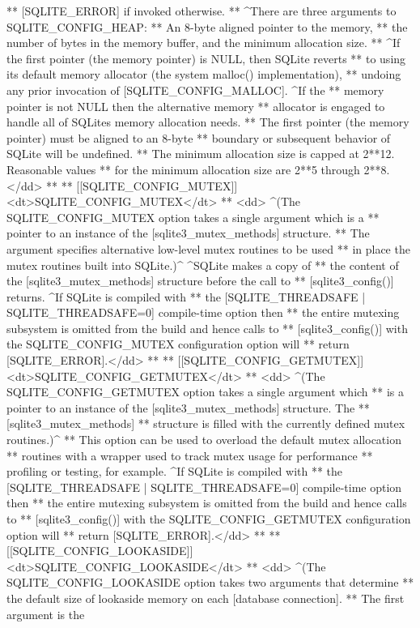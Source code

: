 \begin{Codex}[label=sqlite3.h,numbers=left]
{** [SQLITE_ERROR] if invoked otherwise.
** ^There are three arguments to SQLITE_CONFIG_HEAP:
** An 8-byte aligned pointer to the memory,
** the number of bytes in the memory buffer, and the minimum allocation size.
** ^If the first pointer (the memory pointer) is NULL, then SQLite reverts
** to using its default memory allocator (the system malloc() implementation),
** undoing any prior invocation of [SQLITE_CONFIG_MALLOC].  ^If the
** memory pointer is not NULL then the alternative memory
** allocator is engaged to handle all of SQLites memory allocation needs.
** The first pointer (the memory pointer) must be aligned to an 8-byte
** boundary or subsequent behavior of SQLite will be undefined.
** The minimum allocation size is capped at 2**12. Reasonable values
** for the minimum allocation size are 2**5 through 2**8.</dd>
**
** [[SQLITE_CONFIG_MUTEX]] <dt>SQLITE_CONFIG_MUTEX</dt>
** <dd> ^(The SQLITE_CONFIG_MUTEX option takes a single argument which is a
** pointer to an instance of the [sqlite3_mutex_methods] structure.
** The argument specifies alternative low-level mutex routines to be used
** in place the mutex routines built into SQLite.)^  ^SQLite makes a copy of
** the content of the [sqlite3_mutex_methods] structure before the call to
** [sqlite3_config()] returns. ^If SQLite is compiled with
** the [SQLITE_THREADSAFE | SQLITE_THREADSAFE=0] compile-time option then
** the entire mutexing subsystem is omitted from the build and hence calls to
** [sqlite3_config()] with the SQLITE_CONFIG_MUTEX configuration option will
** return [SQLITE_ERROR].</dd>
**
** [[SQLITE_CONFIG_GETMUTEX]] <dt>SQLITE_CONFIG_GETMUTEX</dt>
** <dd> ^(The SQLITE_CONFIG_GETMUTEX option takes a single argument which
** is a pointer to an instance of the [sqlite3_mutex_methods] structure.  The
** [sqlite3_mutex_methods]
** structure is filled with the currently defined mutex routines.)^
** This option can be used to overload the default mutex allocation
** routines with a wrapper used to track mutex usage for performance
** profiling or testing, for example.   ^If SQLite is compiled with
** the [SQLITE_THREADSAFE | SQLITE_THREADSAFE=0] compile-time option then
** the entire mutexing subsystem is omitted from the build and hence calls to
** [sqlite3_config()] with the SQLITE_CONFIG_GETMUTEX configuration option will
** return [SQLITE_ERROR].</dd>
**
** [[SQLITE_CONFIG_LOOKASIDE]] <dt>SQLITE_CONFIG_LOOKASIDE</dt>
** <dd> ^(The SQLITE_CONFIG_LOOKASIDE option takes two arguments that determine
** the default size of lookaside memory on each [database connection].
** The first argument is the
}
\end{Codex}
